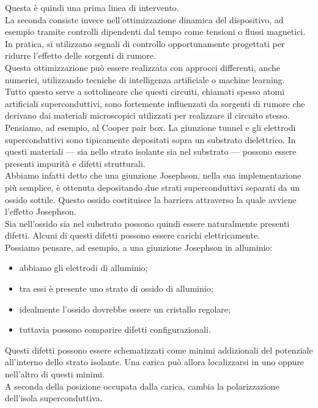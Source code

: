Questa è quindi una prima linea di intervento.\\
La seconda consiste invece nell'ottimizzazione dinamica del dispositivo, ad esempio tramite controlli dipendenti dal tempo come tensioni o flussi magnetici. In pratica, si utilizzano segnali di controllo opportunamente progettati per ridurre l'effetto delle sorgenti di rumore.\\
Questa ottimizzazione può essere realizzata con approcci differenti, anche numerici, utilizzando tecniche di intelligenza artificiale o machine learning.\\
Tutto questo serve a sottolineare che questi circuiti, chiamati spesso atomi artificiali superconduttivi, sono fortemente influenzati da sorgenti di rumore che derivano dai materiali microscopici utilizzati per realizzare il circuito stesso.\\
Pensiamo, ad esempio, al Cooper pair box. La giunzione tunnel e gli elettrodi superconduttivi sono tipicamente depositati sopra un substrato dielettrico. In questi materiali — sia nello strato isolante sia nel substrato — possono essere presenti impurità e difetti strutturali.\\
Abbiamo infatti detto che una giunzione Josephson, nella sua implementazione più semplice, è ottenuta depositando due strati superconduttivi separati da un ossido sottile. Questo ossido costituisce la barriera attraverso la quale avviene l'effetto Josephson.\\
Sia nell'ossido sia nel substrato possono quindi essere naturalmente presenti difetti. Alcuni di questi difetti possono essere carichi elettricamente.\\
Possiamo pensare, ad esempio, a una giunzione Josephson in alluminio:
\begin{itemize}[leftmargin=0.5cm]
    \item abbiamo gli elettrodi di alluminio;
    \item tra essi è presente uno strato di ossido di alluminio;
    \item idealmente l'ossido dovrebbe essere un cristallo regolare;
    \item tuttavia possono comparire difetti configurazionali.
\end{itemize}
Questi difetti possono essere schematizzati come minimi addizionali del potenziale all'interno dello strato isolante. Una carica può allora localizzarsi in uno oppure nell'altro di questi minimi.\\
A seconda della posizione occupata dalla carica, cambia la polarizzazione dell'isola superconduttiva.\\
